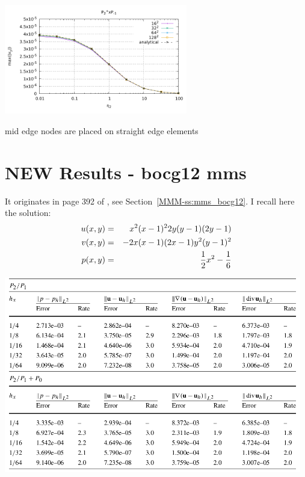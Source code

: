 \begin{center}
\includegraphics[width=8cm]{python_codes/fieldstone_120/paperresults/rt/structured/rt_wave_vel_P2+P-1.pdf} 
\end{center}

mid edge nodes are placed on straight edge elements

\newpage
\section*{NEW Results - bocg12 mms}

It originates in page 392 of \textcite{bocg12}, see Section~\ref{MMM-ss:mms_bocg12}.
I recall here the solution:
\begin{eqnarray}
u(x,y) &=& x^2(x-1)^2 2y(y-1)(2y-1) \nonumber\\
v(x,y) &=& -2x(x-1)(2x -1)y^2(y-1)^2  \nonumber\\
p(x,y) &=& \frac12 x^2 -\frac16 \nonumber
\end{eqnarray}

\begin{center}
\includegraphics[width=13cm]{python_codes/fieldstone_120/images/bocg12tab}
\end{center}

